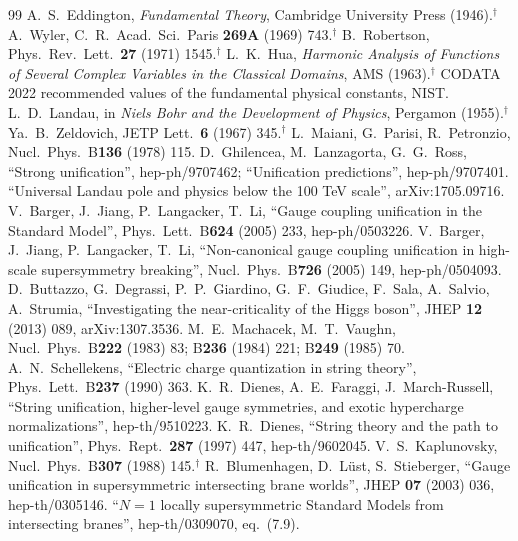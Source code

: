 \documentclass[11pt,a4paper]{article}
\begin{document}
\begin{thebibliography}{99}\small
{} A.~S.~Eddington, \emph{Fundamental Theory}, Cambridge University Press (1946).$^\dagger$
 A.~Wyler, C.~R.~Acad.~Sci.~Paris \textbf{269A} (1969) 743.$^\dagger$
 B.~Robertson, Phys.~Rev.~Lett.~\textbf{27} (1971) 1545.$^\dagger$
 L.~K.~Hua, \emph{Harmonic Analysis of Functions of Several Complex Variables in the Classical Domains}, AMS (1963).$^\dagger$
 CODATA 2022 recommended values of the fundamental physical constants, NIST.
 L.~D.~Landau, in \emph{Niels Bohr and the Development of Physics}, Pergamon (1955).$^\dagger$
 Ya.~B.~Zeldovich, JETP Lett.~\textbf{6} (1967) 345.$^\dagger$
 L.~Maiani, G.~Parisi, R.~Petronzio, Nucl.~Phys.~B\textbf{136} (1978) 115.
 D.~Ghilencea, M.~Lanzagorta, G.~G.~Ross, ``Strong unification'', hep-ph/9707462; ``Unification predictions'', hep-ph/9707401.
 ``Universal Landau pole and physics below the 100 TeV scale'', arXiv:1705.09716.
 V.~Barger, J.~Jiang, P.~Langacker, T.~Li, ``Gauge coupling unification in the Standard Model'', Phys.~Lett.~B\textbf{624} (2005) 233, hep-ph/0503226.
 V.~Barger, J.~Jiang, P.~Langacker, T.~Li, ``Non-canonical gauge coupling unification in high-scale supersymmetry breaking'', Nucl.~Phys.~B\textbf{726} (2005) 149, hep-ph/0504093.
 D.~Buttazzo, G.~Degrassi, P.~P.~Giardino, G.~F.~Giudice, F.~Sala, A.~Salvio, A.~Strumia, ``Investigating the near-criticality of the Higgs boson'', JHEP \textbf{12} (2013) 089, arXiv:1307.3536.
 M.~E.~Machacek, M.~T.~Vaughn, Nucl.~Phys.~B\textbf{222} (1983) 83; B\textbf{236} (1984) 221; B\textbf{249} (1985) 70.
 A.~N.~Schellekens, ``Electric charge quantization in string theory'', Phys.~Lett.~B\textbf{237} (1990) 363.
 K.~R.~Dienes, A.~E.~Faraggi, J.~March-Russell, ``String unification, higher-level gauge symmetries, and exotic hypercharge normalizations'', hep-th/9510223.
 K.~R.~Dienes, ``String theory and the path to unification'', Phys.~Rept.~\textbf{287} (1997) 447, hep-th/9602045.
 V.~S.~Kaplunovsky, Nucl.~Phys.~B\textbf{307} (1988) 145.$^\dagger$
 R.~Blumenhagen, D.~L\"ust, S.~Stieberger, ``Gauge unification in supersymmetric intersecting brane worlds'', JHEP \textbf{07} (2003) 036, hep-th/0305146.
 ``$N=1$ locally supersymmetric Standard Models from intersecting branes'', hep-th/0309070, eq.~(7.9).

\end{thebibliography}
\end{document}
